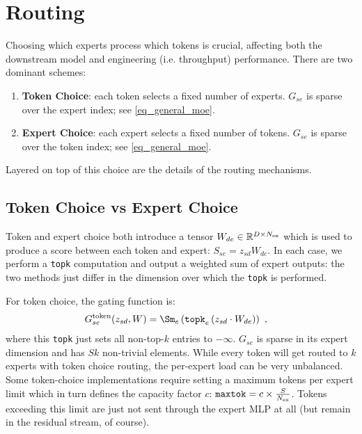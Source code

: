 \section{Routing}


Choosing which experts process which tokens is crucial, affecting both the downstream model and
engineering (i.e. throughput) performance.  There are two dominant schemes:
\begin{enumerate}
    \item \textbf{Token Choice}: each token selects a fixed number of experts. $ G _{ se } $
         is sparse over the expert index; see \eqref{eq_general_moe}.
    \item \textbf{Expert Choice}: each expert selects a fixed number of tokens. $ G _{ se } $ is
        sparse over the token index; see \eqref{eq_general_moe}.
\end{enumerate}
Layered on top of this choice are the details of the routing mechanisms.

\subsection{Token Choice vs Expert Choice}

Token and expert choice both introduce a tensor $W _{ de } \in \mathbb{R} ^{ D\times N _{ {\rm  ex}
} }$ which is used to produce a score between each token and expert: $ S _{ se } = z _{ sd } W _{ de
} $. In each case, we perform a \texttt{topk} computation and output a weighted sum of expert
outputs: the two methods just differ in the dimension over which the \texttt{topk} is performed.

For token choice, the gating function is:
\begin{align}
    G  ^{ {\rm  token} }_{ se }(z _{ sd }, W)  &= \Sm_{ e } \left ( \texttt{topk} _{ e } \left ( z _{ sd } \cdot W _{ de }  \right ) \right ) \ , \label{eq_token_choice}
\end{align}
where this \texttt{topk} just sets all non-top-$ k $ entries to $ -\infty $. $ G _{ se } $
is sparse in its expert dimension and has $ Sk $ non-trivial elements. While every token will get
routed to $ k $ experts with token choice routing, the per-expert load can be very unbalanced. Some
token-choice implementations require setting a maximum tokens per expert limit which in turn defines
the capacity factor $ c $: $ \texttt{maxtok} = c \times \frac{ S }{ N _{ {\rm ex} } } $. Tokens
exceeding this limit are just not sent through the expert MLP at all (but remain in the residual
stream, of course).



